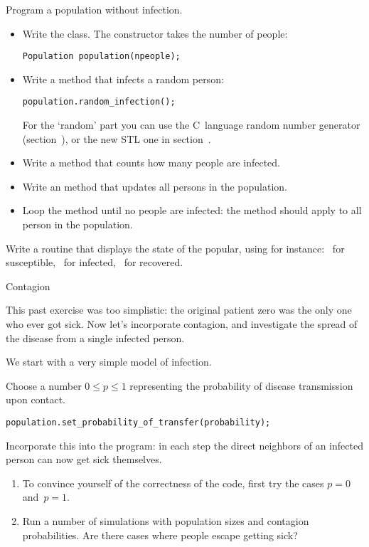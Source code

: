 \begin{exercise}
  \label{ex:infect:notransfer}
  Program a population without infection.
  \begin{itemize}
  \item Write the  class. The constructor takes the number of people:
\begin{lstlisting}
Population population(npeople);  
\end{lstlisting}
  \item Write a method that infects a random person:
\begin{lstlisting}
population.random_infection();
\end{lstlisting}
For the `random' part you can use the C~language random number generator
(section~),
or the new \ac{STL} one in section~.
  \item Write a method  that counts how many people are infected.
  \item Write an  method that updates all persons in the population.
  \item Loop the  method until no people are infected: the
     method should apply  to
    all person in the population.
  \end{itemize}
\item Write a routine that displays the state of the popular, using
  for instance: ~for susceptible, \n{+}~for infected, \n{-}~for recovered.
\end{exercise}

 {Contagion}

This past exercise was too simplistic: the original patient zero was
the only one who ever got sick.
Now let's incorporate contagion, and investigate the spread of the disease
from a single infected person.

We start with a very simple model of infection.

\begin{exercise}
  \label{ex:infect:1}
  Choose a number $0\leq p \leq 1$ representing the probability of
  disease transmission upon contact.
\begin{lstlisting}
population.set_probability_of_transfer(probability);  
\end{lstlisting}
  Incorporate this into the
  program: in each step the direct neighbors of an infected person
  can now get sick themselves.
  \begin{enumerate}
  \item To convince yourself of the correctness of the code,
    first try the cases $p=0$ and~$p=1$.
  \item
    Run a number of simulations with population sizes and contagion
    probabilities. Are there cases where people escape getting sick?
  \end{enumerate}
\end{exercise}

